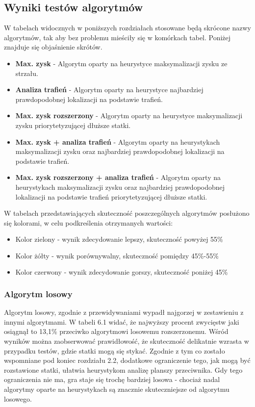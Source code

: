 \subsection{Wyniki testów algorytmów}
W tabelach widocznych w poniższych rozdziałach stosowane będą skrócone nazwy algorytmów, tak aby bez problemu mieściły się w komórkach tabel. Poniżej znajduje się objaśnienie skrótów.
\begin{itemize}
    \item \textbf{Max. zysk} - Algorytm oparty na heurystyce maksymalizacji zysku ze strzału.
    \item \textbf{Analiza trafień} - Algorytm oparty na heurystyce najbardziej prawdopodobnej lokalizacji na podstawie trafień.
    \item \textbf{Max. zysk rozszerzony} - Algorytm oparty na heurystyce maksymalizacji zysku priorytetyzującej dłuższe statki.
    \item \textbf{Max. zysk + analiza trafień} - Algorytm oparty na heurystykach maksymalizacji zysku oraz najbardziej prawdopodobnej lokalizacji na podstawie trafień.
    \item \textbf{Max. zysk rozszerzony + analiza trafień} - Algorytm oparty na heurystykach maksymalizacji zysku oraz najbardziej prawdopodobnej lokalizacji na podstawie trafień priorytetyzującej dłuższe statki. 
\end{itemize}

W tabelach przedstawiających skuteczność poszczególnych algorytmów posłużono się kolorami, w celu podkreślenia otrzymanych wartości:
\begin{itemize}
    \item Kolor zielony - wynik zdecydowanie lepszy, skuteczność powyżej 55\%
    \item Kolor żółty - wynik porównywalny, skuteczność pomiędzy 45\%-55\%
    \item Kolor czerwony - wynik zdecydowanie gorszy, skuteczność poniżej 45\%
\end{itemize}

\subsubsection{Algorytm losowy}

Algorytm losowy, zgodnie z przewidywaniami wypadł najgorzej w zestawieniu z innymi algorytmami. W tabeli 6.1 widać, że najwyższy procent zwycięstw jaki osiągnął to 13,1\% przeciwko algorytmowi losowemu rozszerzonemu. Wśród wyników można zaobserwować prawidłowość, że skuteczność delikatnie wzrasta w przypadku testów, gdzie statki mogą się stykać. Zgodnie z tym co zostało wspomniane pod koniec rozdziału 2.2, dodatkowe ograniczenie tego, jak mogą być rozstawione statki, ułatwia heurystykom analizę planszy przeciwnika. Gdy tego ograniczenia nie ma, gra staje się trochę bardziej losowa - chociaż nadal algorytmy oparte na heurystykach są znacznie skuteczniejsze od algorytmu losowego.

